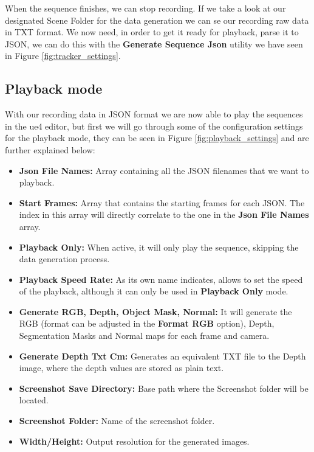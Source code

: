 When the sequence finishes, we can stop recording. If we take a look at our designated Scene Folder for the data generation we can se our recording raw data in TXT format. We now need, in order to get it ready for playback, parse it to JSON, we can do this with the \textbf{Generate Sequence Json} utility we have seen in Figure \ref{fig:tracker_settings}.

\subsection{Playback mode}
\label{sec:playback}

With our recording data in JSON format we are now able to play the sequences in the \gls{ue4} editor, but first we will go through some of the configuration settings for the playback mode, they can be seen in Figure \ref{fig:playback_settings} and are further explained below:

\begin{itemize}
	\item \textbf{Json File Names:} Array containing all the JSON filenames that we want to playback.
	\item \textbf{Start Frames:} Array that contains the starting frames for each JSON. The index in this array will directly correlate to the one in the \textbf{Json File Names} array.
	\item \textbf{Playback Only:} When active, it will only play the sequence, skipping the data generation process.
	\item \textbf{Playback Speed Rate:} As its own name indicates, allows to set the speed of the playback, although it can only be used in \textbf{Playback Only} mode. 
	\item \textbf{Generate RGB, Depth, Object Mask, Normal:} It will generate the RGB (format can be adjusted in the \textbf{Format RGB} option), Depth, Segmentation Masks and Normal maps for each frame and camera.
	\item \textbf{Generate Depth Txt Cm:} Generates an equivalent TXT file to the Depth image, where the depth values are stored as plain text.
	\item \textbf{Screenshot Save Directory:} Base path where the Screenshot folder will be located.
	\item \textbf{Screenshot Folder:} Name of the screenshot folder.
	\item \textbf{Width/Height:} Output resolution for the generated images.
\end{itemize}

